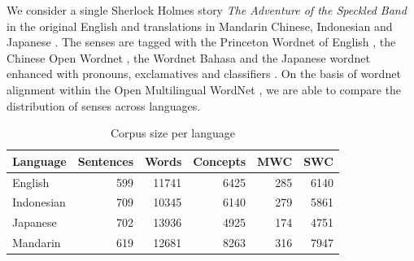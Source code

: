 \documentclass[a4paper,landscape,headrule,footrule,xetex]{foils}
\begin{document}
We consider a single Sherlock Holmes story \textit{The Adventure of
  the Speckled Band}\citep{Doyle:1892} in the original English and
translations in Mandarin Chinese, Indonesian and Japanese \citep[NTU Multilingual Corpus:][]{Tan:Bond:2012}.  The senses
are tagged with the Princeton Wordnet of English
\citep{_Fellbaum:1998}, the Chinese Open Wordnet
\citep[see][]{Wang:Bond:2013}, the Wordnet Bahasa
\citep{Bond:Lim:Tan:Riza:2014} and the Japanese
wordnet\citep{Isahara:Bond:Uchimoto:Utiyama:Kanzaki:2008} enhanced
with pronouns, exclamatives and classifiers
\citep[COW: ][]{Seah:Bond:2014,daCosta:Bond:2016}.  On the basis of wordnet
alignment within the Open Multilingual WordNet
\citep{Bond:Foster:2013}, we are able to compare the distribution of
senses across languages.   

\begin{table}[tbp]
  \centering
\begin{tabular}{lrrrrr}
\hline
 Language   &   Sentences &   Words &   Concepts &    MWC & SWC   \\
\hline                                                            
 English    &         599 &   11741 &        6425 &   285 & 6140  \\
 Indonesian &         709 &   10345 &        6140 &   279 & 5861  \\
 Japanese   &         702 &   13936 &        4925 &   174 & 4751  \\
 Mandarin   &         619 &   12681 &        8263 &   316 & 7947  \\
\hline
\end{tabular}
 
  \caption{Corpus size per language}
  \label{tab:size}
\end{table}

\newpage
\end{document}

